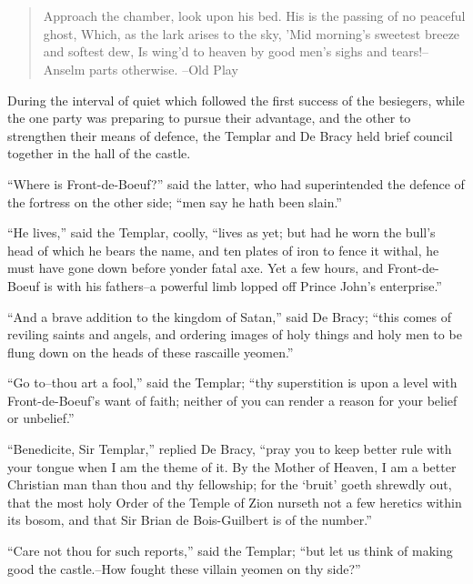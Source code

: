 \chapter{}

\begin{quote}
Approach the chamber, look upon his bed.
His is the passing of no peaceful ghost,
Which, as the lark arises to the sky,
'Mid morning's sweetest breeze and softest dew,
Is wing'd to heaven by good men's sighs and tears!--
Anselm parts otherwise.
--Old Play
\end{quote}

During the interval of quiet which followed the first success of the
besiegers, while the one party was preparing to pursue their advantage,
and the other to strengthen their means of defence, the Templar and De
Bracy held brief council together in the hall of the castle.

``Where is Front-de-Boeuf?'' said the latter, who had superintended the
defence of the fortress on the other side; ``men say he hath been
slain.''

``He lives,'' said the Templar, coolly, ``lives as yet; but had he worn
the bull's head of which he bears the name, and ten plates of iron to
fence it withal, he must have gone down before yonder fatal axe. Yet a
few hours, and Front-de-Boeuf is with his fathers--a powerful limb
lopped off Prince John's enterprise.''

``And a brave addition to the kingdom of Satan,'' said De Bracy; ``this
comes of reviling saints and angels, and ordering images of holy things
and holy men to be flung down on the heads of these rascaille yeomen.''

``Go to--thou art a fool,'' said the Templar; ``thy superstition is upon
a level with Front-de-Boeuf's want of faith; neither of you can render a
reason for your belief or unbelief.''

``Benedicite, Sir Templar,'' replied De Bracy, ``pray you to keep better
rule with your tongue when I am the theme of it. By the Mother of
Heaven, I am a better Christian man than thou and thy fellowship; for
the `bruit' goeth shrewdly out, that the most holy Order of the Temple
of Zion nurseth not a few heretics within its bosom, and that Sir Brian
de Bois-Guilbert is of the number.''

``Care not thou for such reports,'' said the Templar; ``but let us think
of making good the castle.--How fought these villain yeomen on thy
side?''

